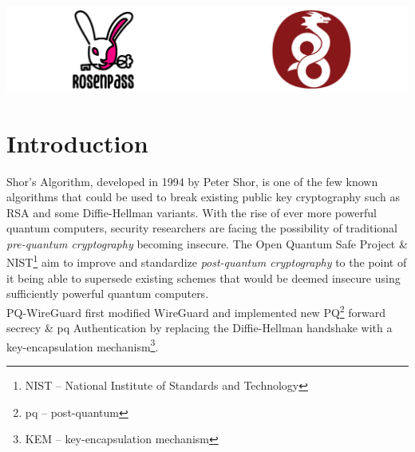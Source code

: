 \documentclass[sigconf]{acmart}
\begin{document}

\begin{teaserfigure}
  \centering
  \includegraphics[width=\textwidth]{graphics/rosenpass+wireguard.pdf}
\end{teaserfigure}


\maketitle


\section{Introduction}
Shor's Algorithm, developed in 1994 by Peter Shor, is one of the few known algorithms that could be used to break existing public key cryptography such as RSA and some Diffie-Hellman variants. With the rise of ever more powerful quantum computers, security researchers are facing the possibility of traditional \textit{pre-quantum cryptography} becoming insecure. The Open Quantum Safe Project\cite{open-quantum-safe} \& NIST\footnote{NIST -- National Institute of Standards and Technology} aim to improve and standardize \textit{post-quantum cryptography} to the point of it being able to supersede existing schemes that would be deemed insecure using sufficiently powerful quantum computers. \\
PQ-WireGuard\cite{cryptoeprint:2020/379} first modified WireGuard and implemented new PQ\footnote{pq -- post-quantum} forward secrecy \& pq Authentication by replacing the Diffie-Hellman handshake with a key-encapsulation mechanism\footnote{KEM -- key-encapsulation mechanism}.
\end{document}
